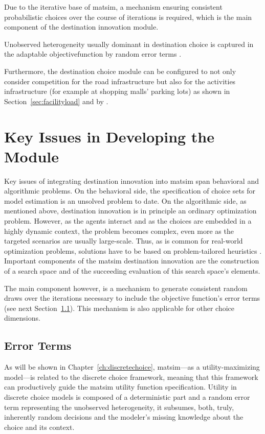 Due to the iterative base of \gls{matsim}, a mechanism ensuring consistent probabilistic choices over the course of iterations is required, which is the main component of the destination innovation module.

Unobserved heterogeneity usually dominant in destination choice is captured in the adaptable \gls{objectivefunction} by random error terms \citep[][]{HorniEtAl_unpub_TRB_2012, Horni_PhDThesis_2013}.

Furthermore, the destination choice module can be configured to not only consider competition for the road infrastructure but also for the activities infrastructure (for example at shopping malls' parking lots) as shown in Section~\ref{sec:facilityload} and by \citet[][]{HorniEtAl_TRR_2009}.

\section{Key Issues in Developing the Module}
Key issues of integrating destination innovation into \gls{matsim} span behavioral and algorithmic problems. 
On the behavioral side, the specification of choice sets for model estimation is an unsolved problem to date. 
On the algorithmic side, as mentioned above, destination innovation is in principle an ordinary optimization problem. 
However, as the agents interact and as the choices are embedded in a highly dynamic context, the problem becomes complex, even more as the targeted scenarios are usually large-scale. 
Thus, as is common for real-world optimization problems, solutions have to be based on problem-tailored heuristics \citep[][]{MichalewiczFogel_2004}. 
Important components of the \gls{matsim} destination innovation are the construction of a search space and of the succeeding evaluation of this search space's elements. 

The main component however, is a mechanism to generate consistent random draws over the iterations necessary to include the objective function's error terms (see next Section~\ref{sec:errorterms}). 
This mechanism is also applicable for other choice dimensions.

\subsection{Error Terms}
\label{sec:errorterms}
As will be shown in Chapter~\ref{ch:discretechoice}, \gls{matsim}---as a utility-maximizing model---is related to the discrete choice framework, meaning that this framework can productively guide the \gls{matsim} utility function specification. 
Utility in discrete choice models is composed of a deterministic part and a random error term representing the unobserved heterogeneity, \ie it subsumes, both, truly, \ie inherently random decisions and the modeler's missing knowledge about the choice and its context. 

